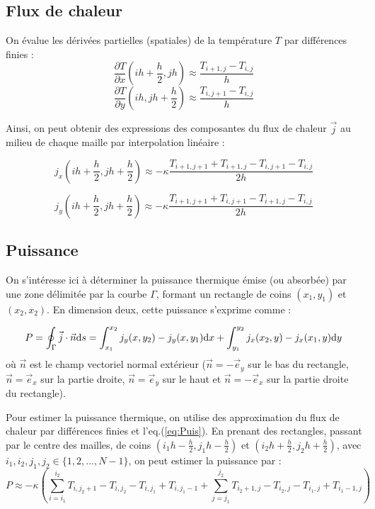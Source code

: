 \documentclass[a4paper,12pt,oneside]{article}
\def \be {\begin{equation}}
\def \ee {\end{equation}}
\def \dd  {{\rm d}}
\begin{document}
\subsection{Flux de chaleur \label{sec:flux}}

On évalue les dérivées partielles (spatiales) de la température $T$ par différences finies : 
\be
\frac{\partial T}{\partial x}(ih+\frac{h}{2},jh) \approx \frac{T_{i+1,j}-T_{i,j}}{h}
\ee
\be
\frac{\partial T}{\partial y}(ih,jh+\frac{h}{2}) \approx \frac{T_{i,j+1}-T_{i,j}}{h}
\ee

Ainsi, on peut obtenir des expressions des composantes du flux de chaleur $\vec{j}$ au milieu de chaque maille par interpolation linéaire :

\be
j_x(ih+\frac{h}{2},jh+\frac{h}{2}) \approx -\kappa\frac{T_{i+1,j+1}+T_{i+1,j}-T_{i,j+1}-T_{i,j}}{2h}
\ee

\be
j_y(ih+\frac{h}{2},jh+\frac{h}{2}) \approx -\kappa \frac{T_{i+1,j+1}+T_{i,j+1}-T_{i+1,j}-T_{i,j}}{2h}
\ee

\subsection{Puissance \label{sec:puissance}}

On s'intéresse ici à déterminer la puissance thermique émise (ou absorbée) par une zone délimitée par la courbe $\Gamma$, formant un rectangle de coins $(x_1,y_1)$ et $(x_2,x_2)$. En dimension deux, cette puissance s'exprime comme : 

\be
 P= \oint_{\Gamma} \vec{j} \cdot \vec{n} \dd s 
= \int_{x_1}^{x_2} j_y(x,y_2)-j_y(x,y_1) \dd x + \int_{y_1}^{y_2} j_x(x_2,y)-j_x(x_1,y) \dd y    
\label{eq:Puis}
\ee
où $\vec{n}$ est le champ vectoriel normal extérieur ($\vec{n}=-\vec{e}_y$ sur le bas du rectangle, $\vec{n}=\vec{e}_x$ sur la partie droite, $\vec{n}=\vec{e}_y$ sur le haut et $\vec{n}=-\vec{e}_x$ sur la partie droite du rectangle).

Pour estimer la puissance thermique, on utilise des approximation du flux de chaleur par différences finies et l'eq.(\ref{eq:Puis}). En prenant des rectangles, passant par le centre des mailles, de coins $(i_1 h-\frac{h}{2},j_1 h-\frac{h}{2})$ et $(i_2 h+\frac{h}{2},j_2 h+\frac{h}{2})$, avec $i_1,i_2,j_1,j_2 \in \{1,2,...,N-1\}$, on peut estimer la puissance par :
\be
P \approx - \kappa \left( \sum_{i=i_1}^{i_2} T_{i,j_2+1}-T_{i,j_2}-T_{i,j_1}+T_{i,j_1-1} +  \sum_{j=j_1}^{j_2} T_{i_2+1,j}-T_{i_2,j}-T_{i_1,j}+T_{i_1-1,j} \right)
\ee
\end{document}
